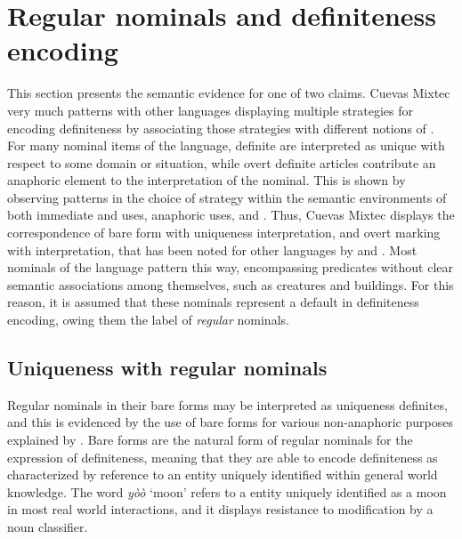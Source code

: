\documentclass[output=paper,modfonts,nonflat]{langsci/langscibook}
\begin{document}
\section{Regular nominals and definiteness encoding} \label{sec:cisneros:4}

This section presents the semantic evidence for one of two claims.  Cuevas Mixtec very much patterns with other languages displaying multiple strategies for encoding definiteness by associating those strategies with different notions of .  For many nominal items of the language, definite  are interpreted as unique with respect to some domain or situation, while overt definite articles contribute an anaphoric element to the interpretation of the nominal.  This is shown by observing patterns in the choice of  strategy within the semantic environments of both immediate and  uses, anaphoric uses, and .  Thus, Cuevas Mixtec displays the correspondence of bare form with uniqueness interpretation, and overt marking with  interpretation, that has been noted for other languages by \citet{Schwarz2013} and \citet{Jenks2015}.  Most nominals of the language pattern this way, encompassing predicates without clear semantic associations among themselves, such as creatures and buildings.  For this reason, it is assumed that these nominals represent a default in definiteness encoding, owing them the label of \textit{regular} nominals.

\subsection{Uniqueness with regular nominals} \label{sec:cisneros:4.1}

Regular nominals in their bare forms may be interpreted as uniqueness definites, and this is evidenced by the use of bare forms for various non-anaphoric purposes explained by \citet{Hawkins1978}. Bare forms are the natural form of regular nominals for the expression of  definiteness, meaning that they are able to encode definiteness as characterized by reference to an entity uniquely identified within general world knowledge.  The word \textit{y\`o\`o} `moon' refers to a entity uniquely identified as a moon in most real world interactions, and it displays resistance to modification by a noun classifier.
\end{document}

